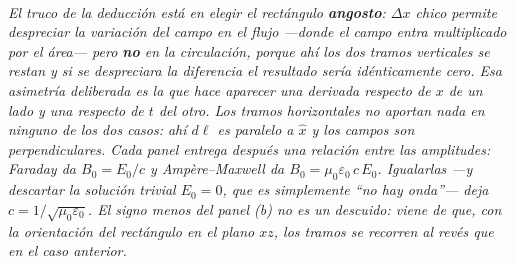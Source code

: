 \begin{center}
\\[0.5em]
{\small\itshape El truco de la deducción está en elegir el rectángulo
\textbf{angosto}: $\Delta x$ chico permite despreciar la variación del campo
\emph{en el flujo} ---donde el campo entra multiplicado por el área--- pero
\textbf{no} en la circulación, porque ahí los dos tramos verticales se restan y
si se despreciara la diferencia el resultado sería idénticamente cero. Esa
asimetría deliberada es la que hace aparecer una derivada respecto de $x$ de un
lado y una respecto de $t$ del otro. Los tramos horizontales no aportan nada en
ninguno de los dos casos: ahí $d\boldsymbol{\ell}$ es paralelo a $\hat x$ y los
campos son perpendiculares. Cada panel entrega después una relación entre las
amplitudes: Faraday da $B_0 = E_0/c$ y Ampère--Maxwell da
$B_0 = \mu_0\varepsilon_0\,c\,E_0$. Igualarlas ---y descartar la solución
trivial $E_0 = 0$, que es simplemente \enquote{no hay onda}--- deja
$c = 1/\sqrt{\mu_0\varepsilon_0}$. El signo menos del panel (b) no es un
descuido: viene de que, con la orientación del rectángulo en el plano $xz$, los
tramos se recorren al revés que en el caso anterior.}
\end{center}
